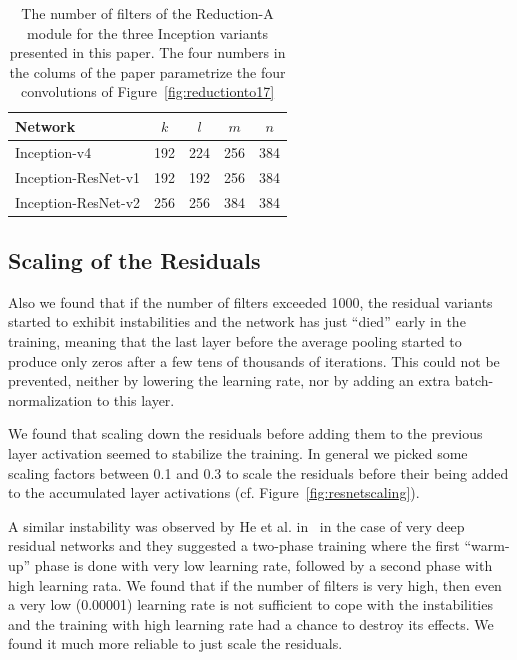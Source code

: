 \begin{table}
{\small
 \begin{center}
   \begin{tabular}[H]{|l|c|c|c|c|}
   \hline
   {\bf Network} & {$k$} & {$l$} & {$m$} & {$n$} \\
   \hline
   Inception-v4 & 192 & 224 & 256 & 384 \\
   Inception-ResNet-v1 & 192 & 192 & 256 & 384 \\
   Inception-ResNet-v2 & 256 & 256 & 384 & 384 \\
   \hline
   \end{tabular}
 \end{center}
 }
\caption{The number of filters of the Reduction-A module for the three
  Inception variants presented in this paper. The four numbers in the
  colums of the paper parametrize the four convolutions of Figure~\ref{fig:reductionto17} }
\label{reductionto17params}
\end{table}

\subsection{Scaling of the Residuals}
Also we found that if the number of filters exceeded 1000, the residual
variants started to exhibit instabilities and the network has just
``died'' early in the training, meaning that the last layer before the
average pooling started to produce only zeros after a few tens of thousands of
iterations. This could not be prevented, neither by lowering the learning
rate, nor by adding an extra batch-normalization to this layer.

We found that scaling down the residuals before adding them to
the previous layer activation seemed to stabilize the training. In general
we picked some scaling factors between 0.1 and 0.3 to scale the residuals
before their being added to the accumulated layer activations
(cf. Figure~\ref{fig:resnetscaling}).

A similar instability was observed by He et al. in~\cite{he2015deep} in
the case of very deep residual networks and they suggested a two-phase
training where the first ``warm-up'' phase is done with very low learning
rate, followed by a second phase with high learning rata. We found that
if the number of filters is very high, then even a very low (0.00001) learning
rate is not sufficient to cope with the instabilities and the training with
high learning rate had a chance to destroy its effects. We found it much
more reliable to just scale the residuals.


